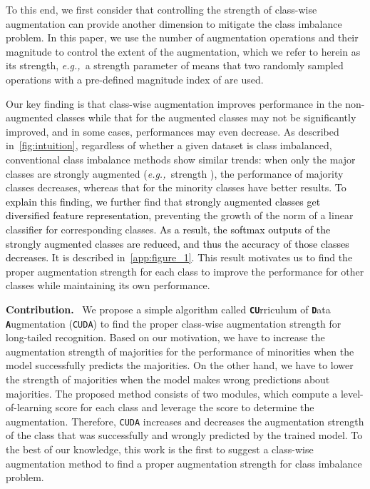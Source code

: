 \documentclass{article}
\newcommand{\eg}{\emph{e.g.,~}}
\newcommand{\myparagraph}[1]{\vspace{0.07cm}\noindent\textbf{#1}~}
\def\code#1{\texttt{#1}}
\newcommand{\alg}{\code{CUDA}\xspace}
\newcommand{\rebut}[1]{\textcolor{black}{#1}}
\begin{document}
To this end, we first consider that controlling the strength of class-wise augmentation can provide another dimension to mitigate the class imbalance problem. In this paper, we use the number of augmentation operations and their magnitude to control the extent of the augmentation, which we refer to herein as its strength, \eg a strength parameter of  means that two randomly sampled operations with a pre-defined magnitude index of  are used.

Our key finding is that class-wise augmentation improves performance in the non-augmented classes while that for the augmented classes may not be significantly improved, and in some cases, performances may even decrease. As described in~\autoref{fig:intuition}, regardless of whether a given dataset is class imbalanced, conventional class imbalance methods show similar trends: when only the major classes are strongly augmented (\eg  strength ), the performance of majority classes decreases, whereas that for the minority classes have better results. \rebut{To explain this finding, we further} find that \rebut{strongly augmented classes get diversified feature representation,} preventing the growth of the norm of a linear classifier for corresponding classes. \rebut{As a result, the softmax outputs of the strongly augmented classes are reduced, and thus the accuracy of those classes decreases.}
It is described in~\autoref{app:figure_1}. 
This result motivates us to find the proper augmentation strength for each class to improve the performance for other classes while maintaining its own performance.

\myparagraph{Contribution.}
We propose a simple algorithm called \textbf{\code{CU}}rriculum of \textbf{\code{D}}ata \textbf{\code{A}}ugmentation (\alg) to find the proper class-wise augmentation strength for long-tailed recognition. Based on our motivation, we have to increase the augmentation strength of majorities for the performance of minorities when the model successfully predicts the majorities. On the other hand, we have to lower the strength of majorities when the model makes wrong predictions about majorities. 
The proposed method consists of two modules, which compute a level-of-learning score for each class and leverage the score to determine the augmentation. 
Therefore, \alg increases and decreases the augmentation strength of the class that was successfully and wrongly predicted by the trained model. 
To the best of our knowledge, this work is the first to suggest a class-wise augmentation method to find a proper augmentation strength for class imbalance problem.
\end{document}
